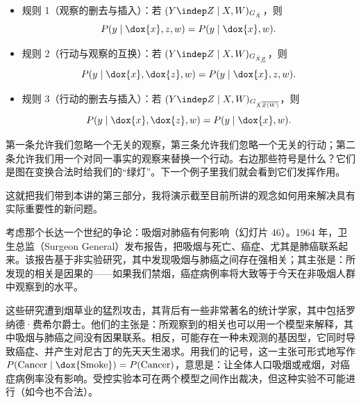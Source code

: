 \begin{itemize}[leftmargin=2.2em,itemsep=0.45em]
\item 规则 1（观察的删去与插入）：若 $(Y\indep Z\mid X,W)_{G_{\bar X}}$，则
\[
P(y\mid\dox{x},z,w)=P(y\mid\dox{x},w).
\]
\item 规则 2（行动与观察的互换）：若 $(Y\indep Z\mid X,W)_{G_{\bar X\underline{Z}}}$，则
\[
P(y\mid\dox{x},\dox{z},w)=P(y\mid\dox{x},z,w).
\]
\item 规则 3（行动的删去与插入）：若 $(Y\indep Z\mid X,W)_{G_{\bar X\overline{Z(W)}}}$，则
\[
P(y\mid\dox{x},\dox{z},w)=P(y\mid\dox{x},w).
\]
\end{itemize}

第一条允许我们忽略一个无关的观察，第三条允许我们忽略一个无关的行动；第二条允许我们用一个对同一事实的观察来替换一个行动。右边那些符号是什么？它们是图在变换合法时给我们的“绿灯”。下一个例子里我们就会看到它们发挥作用。

这就把我们带到本讲的第三部分，我将演示截至目前所讲的观念如何用来解决具有实际重要性的新问题。

考虑那个长达一个世纪的争论：吸烟对肺癌有何影响（幻灯片 46）。1964 年，卫生总监（Surgeon General）发布报告，把吸烟与死亡、癌症、尤其是肺癌联系起来。该报告基于非实验研究，其中发现吸烟与肺癌之间存在强相关；其主张是：所发现的相关是因果的——如果我们禁烟，癌症病例率将大致等于今天在非吸烟人群中观察到的水平。

这些研究遭到烟草业的猛烈攻击，其背后有一些非常著名的统计学家，其中包括罗纳德·费希尔爵士。他们的主张是：所观察到的相关也可以用一个模型来解释，其中吸烟与肺癌之间没有因果联系。相反，可能存在一种未观测的基因型，它同时导致癌症、并产生对尼古丁的先天天生渴求。用我们的记号，这一主张可形式地写作 $P(\text{Cancer}\mid\dox{\text{Smoke}})=P(\text{Cancer})$，意思是：让全体人口吸烟或戒烟，对癌症病例率没有影响。受控实验本可在两个模型之间作出裁决，但这种实验不可能进行（如今也不合法）。

\begin{center}
\end{center}

